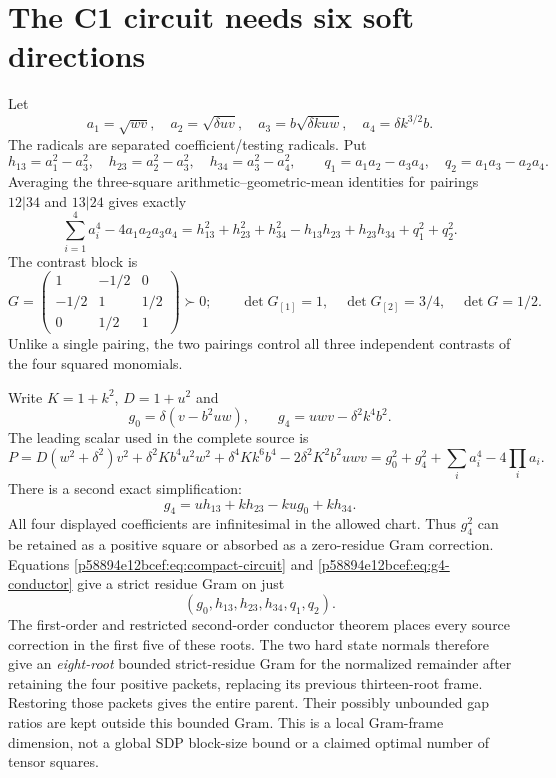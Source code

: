 \section{\texorpdfstring{The C1 circuit needs six soft directions}{The C1 circuit needs six soft directions}}
\label{component:p58894e12bcef}

Let
\[
a_1=\sqrt{wv},\quad a_2=\sqrt{\delta uv},\quad
a_3=b\sqrt{\delta kuw},\quad a_4=\delta k^{3/2}b.
\]
The radicals are separated coefficient/testing radicals. Put
\[
h_{13}=a_1^2-a_3^2,\quad h_{23}=a_2^2-a_3^2,\quad
h_{34}=a_3^2-a_4^2,
\qquad q_1=a_1a_2-a_3a_4,\quad q_2=a_1a_3-a_2a_4.
\]
Averaging the three-square arithmetic--geometric-mean identities for
pairings $12|34$ and $13|24$ gives exactly
\begin{equation}
\sum_{i=1}^4a_i^4-4a_1a_2a_3a_4
=h_{13}^2+h_{23}^2+h_{34}^2-h_{13}h_{23}+h_{23}h_{34}
 +q_1^2+q_2^2.\label{p58894e12bcef:eq:compact-circuit}
\end{equation}
The contrast block is
\[
G=\begin{pmatrix}1&-1/2&0\\-1/2&1&1/2\\0&1/2&1\end{pmatrix}\succ0;
\qquad \det G_{[1]}=1,\quad\det G_{[2]}=3/4,\quad\det G=1/2.
\]
Unlike a single pairing, the two pairings control all three independent
contrasts of the four squared monomials.

Write $K=1+k^2$, $D=1+u^2$ and
\[
g_0=\delta(v-b^2uw),\qquad g_4=uwv-\delta^2k^4b^2.
\]
The leading scalar used in the complete source is
\[
P=D(w^2+\delta^2)v^2+\delta^2Kb^4u^2w^2+
\delta^4Kk^6b^4-2\delta^2K^2b^2uwv
=g_0^2+g_4^2+\sum_i a_i^4-4\prod_i a_i.
\]
There is a second exact simplification:
\begin{equation}
g_4=u h_{13}+k h_{23}-ku g_0+k h_{34}.\label{p58894e12bcef:eq:g4-conductor}
\end{equation}
All four displayed coefficients are infinitesimal in the allowed chart.
Thus $g_4^2$ can be retained as a positive square or absorbed as a
zero-residue Gram correction. Equations \eqref{p58894e12bcef:eq:compact-circuit} and
\eqref{p58894e12bcef:eq:g4-conductor} give a strict residue Gram on just
\[
\boxed{(g_0,h_{13},h_{23},h_{34},q_1,q_2).}
\]
The first-order and restricted second-order conductor theorem places
every source correction in the first five of these roots. The two hard
state normals therefore give an \emph{eight-root} bounded strict-residue
Gram for the normalized remainder after retaining the four positive
packets, replacing its previous thirteen-root frame. Restoring those
packets gives the entire parent. Their possibly unbounded gap ratios
are kept outside this bounded Gram. This is a local Gram-frame
dimension, not a global SDP block-size bound or a claimed optimal number
of tensor squares.

